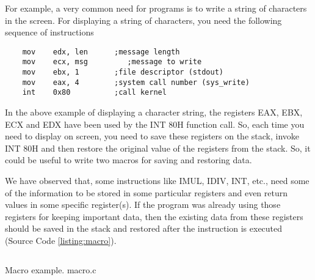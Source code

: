 For example, a very common need for programs is to write a string of characters in the screen. For displaying a string of characters, you need the following sequence of instructions

\begin{verbatim}
	mov    edx, len	     ;message length
	mov    ecx, msg 	    ;message to write
	mov    ebx, 1        ;file descriptor (stdout)
	mov    eax, 4        ;system call number (sys_write)
	int    0x80          ;call kernel
\end{verbatim}

In the above example of displaying a character string, the registers EAX, EBX, ECX and EDX have been used by the INT 80H function call. So, each time you need to display on screen, you need to save these registers on the stack, invoke INT 80H and then restore the original value of the registers from the stack. So, it could be useful to write two macros for saving and restoring data.

We have observed that, some instructions like IMUL, IDIV, INT, etc., need some of the information to be stored in some particular registers and even return values in some specific register(s). If the program was already using those registers for keeping important data, then the existing data from these registers should be saved in the stack and restored after the instruction is executed (Source Code \ref{listing:macro}).

\newpage
\begin{listing}[H]
\inputminted{nasm}{code/macro.asm}
\caption{Macro example. macro.c}
\label{listing:macro}
\end{listing}
